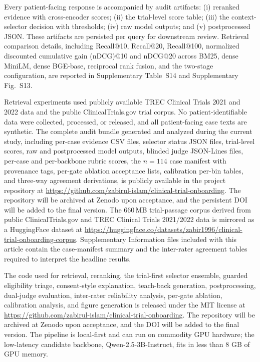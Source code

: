 \documentclass[pdflatex,Numbered]{sn-jnl}
\theoremstyle{plain}
\begin{document}
Every patient-facing response is accompanied by audit artifacts: (i) reranked evidence with cross-encoder scores; (ii) the trial-level score table; (iii) the context-selector decision with thresholds; (iv) raw model outputs; and (v) postprocessed JSON. These artifacts are persisted per query for downstream review. Retrieval comparison details, including Recall@10, Recall@20, Recall@100, normalized discounted cumulative gain (nDCG)@10 and nDCG@20 across BM25, dense MiniLM, dense BGE-base, reciprocal rank fusion, and the two-stage configuration, are reported in Supplementary Table~S14 and Supplementary Fig.~S13.

\sloppy
Retrieval experiments used publicly available TREC Clinical Trials 2021 and 2022 data \citep{roberts2021trec,koopman2016trec,soboroff2022trec} and the public ClinicalTrials.gov trial corpus. No patient-identifiable data were collected, processed, or released, and all patient-facing case texts are synthetic. The complete audit bundle generated and analyzed during the current study, including per-case evidence CSV files, selector status JSON files, trial-level scores, raw and postprocessed model outputs, blinded judge JSON-Lines files, per-case and per-backbone rubric scores, the $n=114$ case manifest with provenance tags, per-gate ablation acceptance lists, calibration per-bin tables, and three-way agreement derivations, is publicly available in the project repository at \url{https://github.com/zabirul-islam/clinical-trial-onboarding}. The repository will be archived at Zenodo upon acceptance, and the persistent DOI will be added to the final version. The 660\,MB trial-passage corpus derived from public ClinicalTrials.gov and TREC Clinical Trials 2021/2022 data is mirrored as a HuggingFace dataset at \url{https://huggingface.co/datasets/zabir1996/clinical-trial-onboarding-corpus}. Supplementary Information files included with this article contain the case-manifest summary and the inter-rater agreement tables required to interpret the headline results.
\fussy

The code used for retrieval, reranking, the trial-first selector ensemble, guarded eligibility triage, consent-style explanation, teach-back generation, postprocessing, dual-judge evaluation, inter-rater reliability analysis, per-gate ablation, calibration analysis, and figure generation is released under the MIT license at \url{https://github.com/zabirul-islam/clinical-trial-onboarding}. The repository will be archived at Zenodo upon acceptance, and the DOI will be added to the final version. The pipeline is local-first and can run on commodity GPU hardware; the low-latency candidate backbone, Qwen-2.5-3B-Instruct, fits in less than 8 GB of GPU memory.
\end{document}
